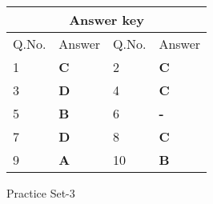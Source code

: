 \setlength\arrayrulewidth{1pt}
\begin{table}[H]
	\centering
	\begin{tabular}{|p{1.5cm}|p{1.5cm}||p{1.5cm}|p{1.5cm}|}
		\hline
		\multicolumn{4}{|c|}{\textbf{Answer key}}\\\hline\hline
		\rowcolor{ocrel}Q.No.&Answer&Q.No.&Answer\\\hline
		1&\textbf{C} &2&\textbf{C}\\\hline 
		3&\textbf{D} &4&\textbf{C} \\\hline
		5&\textbf{B} &6&\textbf{-} \\\hline
		7&\textbf{D}&8&\textbf{C}\\\hline
		9&\textbf{A}&10&\textbf{B}\\\hline
		
	\end{tabular}
\end{table}
\newpage
\begin{abox}
	Practice Set-3
	\end{abox}
